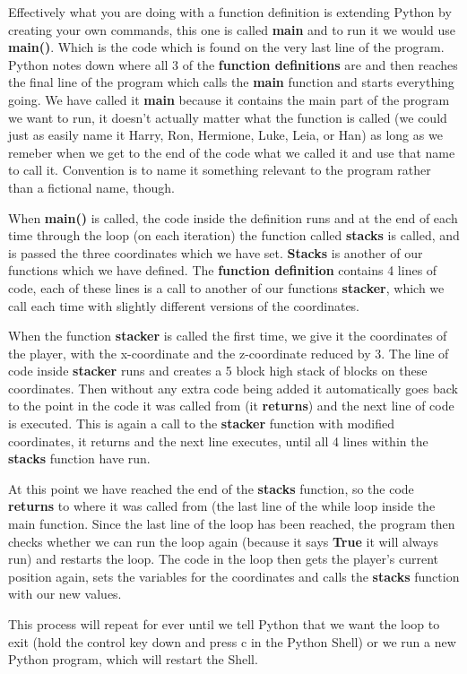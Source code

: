 \documentclass{geocraft-worksheet-multipage}
\begin{document}
\newpage

Effectively what you are doing with a function definition is extending Python by creating your own commands, this one is
called \textbf{main} and to run it we would use \textbf{main()}. Which is the code which is found on the very last line
of the program. Python notes down where all 3 of the \textbf{function definitions} are and then reaches the final line
of the program which calls the \textbf{main} function and starts everything going. We have called it \textbf{main}
because it contains the main part of the program we want to run, it doesn't actually matter what the function is called
(we could just as easily name it Harry, Ron, Hermione, Luke, Leia, or Han) as long as we remeber when we get to the end
of the code what we called it and use that name to call it. Convention is to name it something relevant to the program
rather than a fictional name, though.  \vspace{0.5cm} 


When \textbf{main()} is called, the code inside the definition runs and at the end of each time through the loop (on
each iteration) the function called \textbf{stacks} is called, and is passed the three coordinates which we have
set. \textbf{Stacks} is another of our functions which we have defined. The \textbf{function definition} contains 4
lines of code, each of these lines is a call to another of our functions \textbf{stacker}, which we call each time with
slightly different versions of the coordinates.  \vspace{0.5cm}


When the function \textbf{stacker} is called the first time, we give it the coordinates of the player, with the
x-coordinate and the z-coordinate reduced by 3. The line of code inside \textbf{stacker} runs and creates a 5 block high
stack of blocks on these coordinates. Then without any extra code being added it automatically goes back to the point in
the code it was called from (it \textbf{returns}) and the next line of code is executed. This is again a call to the
\textbf{stacker} function with modified coordinates, it returns and the next line executes, until all 4 lines within the
\textbf{stacks} function have run.  \vspace{0.5cm}


At this point we have reached the end of the \textbf{stacks} function, so the code \textbf{returns} to where it was
called from (the last line of the while loop inside the main function. Since the last line of the loop has been reached,
the program then checks whether we can run the loop again (because it says \textbf{True} it will always run) and
restarts the loop. The code in the loop then gets the player's current position again, sets the variables for the
coordinates and calls the \textbf{stacks} function with our new values.  \vspace{0.5cm}


This process will repeat for ever until we tell Python that we want the loop to exit (hold the control key down and
press c in the Python Shell) or we run a new Python program, which will restart the Shell.  \vspace{0.5cm} 
\end{document}
